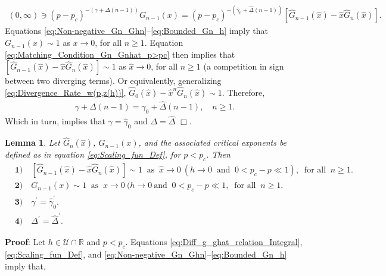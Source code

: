 \documentclass[english,12pt,jmp,graphicx]{revtex4-1}
\newtheorem{lemma}{Lemma}[section]
\newcommand{\ph}{\hat{\phi}}
\newcommand{\gh}{\hat{\gamma}}
\newcommand{\Dh}{\hat{\Delta}}
\newcommand{\xh}{\hat{x}}
\begin{document}
%
\begin{align}\label{eq:Matching_Condition_Gn_Gnhat_p>pc}
  (0,\infty)\ni(p-p_c)^{-(\gamma+\Delta(n-1))}G_{n-1}(x)
       =(p-p_c)^{-(\gh_0+\Dh(n-1))}[\hat{G}_{n-1}(\xh)-\xh\hat{G}_n(\xh)].
\end{align}
%
Equations \eqref{eq:Non-negative_Gn_Ghn}--\eqref{eq:Bounded_Gn_h}
imply that $G_{n-1}(x)\sim1$ as $x\to0$, for all $n\geq1$. Equation
\eqref{eq:Matching_Condition_Gn_Gnhat_p>pc} then implies that 
$[\hat{G}_{n-1}(\xh)-\xh\hat{G}_n(\xh)]\sim1$ as $\xh\to0$,
for all $n\geq1$ (a competition in sign between two diverging
terms). Or equivalently, generalizing
\eqref{eq:Divergence_Rate_w(p,z(h))},
$\hat{G}_0(\xh)-\xh^n\hat{G}_n(\xh)\sim1$. Therefore,   
%
\begin{align}
  \gamma+\Delta(n-1)=\gh_0+\Dh(n-1), \quad n\geq1.
\end{align}
%
Which in turn, implies that $\gamma=\gh_0$ and $\Delta=\Dh$ $\Box$.
%
%
 \begin{lemma}\label{lem:asymp_Scaling_funs_x_to_0_p<pc}
   Let $\hat{G}_n(\xh)$, $G_{n-1}(x)$, and the associated critical
   exponents be defined as in equation \eqref{eq:Scaling_fun_Def}, for
   $p<p_c$. Then
     \begin{align*}
    &\mathbf{1)}\quad [\hat{G}_{n-1}(\xh)-\xh\hat{G}_n(\xh)]\sim1 \ \text{ as } \ \xh\to0 \ (h\to0
    \ \text{ and } \ 0<p_c-p\ll1), \ \text{ for all } \ n\geq1. \\
    &\mathbf{2)}\quad G_{n-1}(x)\sim1 \ \text{ as } \ x\to0 \ (h\to0 \ \text{
      and } \ 0<p_c-p\ll1, \ \text{ for all } \ n\geq1.\\
    &\mathbf{3)}\quad \gamma^\prime=\gh_0^\prime.  \\%
    &\mathbf{4)}\quad \Delta^\prime=\Dh^\prime.   
     \end{align*}
 \end{lemma}
%
\noindent \textbf{Proof}:
%
Let $h\in\mathcal{U}\cap\mathbb{R}$ and $p<p_c$.
Equations \eqref{eq:Diff_g_ghat_relation_Integral}, 
\eqref{eq:Scaling_fun_Def}, and
\eqref{eq:Non-negative_Gn_Ghn}--\eqref{eq:Bounded_Gn_h} imply that,
\end{document}
